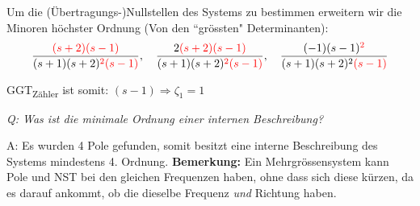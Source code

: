         Um die (Übertragungs-)Nullstellen des Systems zu bestimmen erweitern wir die Minoren höchster Ordnung (Von den ``grössten" Determinanten):
        \begin{equation*}
            \frac{\textcolor{red}{(s+2)(s-1)}}{(s+1)(s+2)\textcolor{red}{^2(s-1)}},\quad \frac{2\textcolor{red}{(s+2)(s-1)}}{(s+1)(s+2)\textcolor{red}{^2(s-1)}},\quad \frac{(-1)(s-1)\textcolor{red}{^2}}{(s+1)(s+2)^2\textcolor{red}{(s-1)}}
        \end{equation*}
        
        GGT\textsubscript{Zähler} ist somit: $(s-1) \Rightarrow \zeta_1 = 1$
            
        \textit{Q: Was ist die minimale Ordnung einer internen Beschreibung?}
        
        A: Es wurden 4 Pole gefunden, somit besitzt eine interne Beschreibung des Systems mindestens 4. Ordnung. \textbf{Bemerkung:} Ein Mehrgrössensystem kann Pole und NST bei den gleichen Frequenzen haben, ohne dass sich diese kürzen, da es darauf ankommt, ob die dieselbe Frequenz \textit{und} Richtung haben.
        